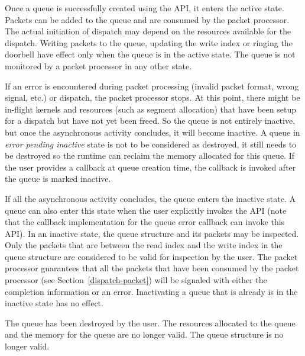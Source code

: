 \documentclass[final]{book}
\begin{document}
\begin{description}[leftmargin=0cm, labelindent=0cm]
\item[Active] Once a queue is successfully created using the
   API, it enters the active state. Packets can be
  added to the queue and are consumed by the packet processor. The actual
  initiation of dispatch may depend on the resources available for the
  dispatch. Writing packets to the queue, updating the write index or ringing
  the doorbell have effect only when the queue is in the active state. The queue
  is not monitored by a packet processor in any other state.

\item[Error pending inactive] If an error is encountered during packet
  processing (invalid packet format, wrong signal, etc.) or dispatch, the packet
  processor stops. At this point, there might be in-flight kernels and resources
  (such as segment allocation) that have been setup for a dispatch but have not
  yet been freed. So the queue is not entirely inactive, but once the
  asynchronous activity concludes, it will become inactive. A queue in
  \emph{error pending inactive} state is not to be considered as destroyed, it
  still needs to be destroyed so the runtime can reclaim the memory allocated
  for this queue. If the user provides a callback at queue creation time, the
  callback is invoked after the queue is marked inactive.

\item[Inactive] If all the asynchronous activity concludes, the queue enters the
  inactive state. A queue can also enter this state when the user explicitly
  invokes the  API (note that the callback
  implementation for the queue error callback can invoke this API). In an
  inactive state, the queue structure and its packets may be inspected. Only the
  packets that are between the read index and the write index in the queue
  structure are considered to be valid for inspection by the user. The packet
  processor guarantees that all the packets that have been consumed by the
  packet processor (see Section~\ref{dispatch-packet}) will be signaled with
  either the completion information or an error. Inactivating a queue that is
  already is in the inactive state has no effect.

\item[Destroyed] The queue has been destroyed by the user. The resources
  allocated to the queue and the memory for the queue are no longer valid. The
  queue structure is no longer valid.
\end{description}
\end{document}
